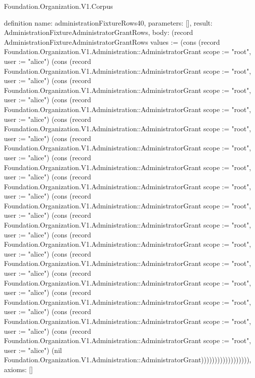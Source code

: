 \begin{lexlean}{Foundation.Organization.V1.Corpus}
\begin{semanticmodule}
definition{
  name: administrationFixtureRows40,
  parameters: [],
  result: AdministrationFixtureAdministratorGrantRows,
  body: (record AdministrationFixtureAdministratorGrantRows {values := (cons (record Foundation.Organization.V1.Administration::AdministratorGrant {scope := "root", user := "alice"}) (cons (record Foundation.Organization.V1.Administration::AdministratorGrant {scope := "root", user := "alice"}) (cons (record Foundation.Organization.V1.Administration::AdministratorGrant {scope := "root", user := "alice"}) (cons (record Foundation.Organization.V1.Administration::AdministratorGrant {scope := "root", user := "alice"}) (cons (record Foundation.Organization.V1.Administration::AdministratorGrant {scope := "root", user := "alice"}) (cons (record Foundation.Organization.V1.Administration::AdministratorGrant {scope := "root", user := "alice"}) (cons (record Foundation.Organization.V1.Administration::AdministratorGrant {scope := "root", user := "alice"}) (cons (record Foundation.Organization.V1.Administration::AdministratorGrant {scope := "root", user := "alice"}) (cons (record Foundation.Organization.V1.Administration::AdministratorGrant {scope := "root", user := "alice"}) (cons (record Foundation.Organization.V1.Administration::AdministratorGrant {scope := "root", user := "alice"}) (cons (record Foundation.Organization.V1.Administration::AdministratorGrant {scope := "root", user := "alice"}) (cons (record Foundation.Organization.V1.Administration::AdministratorGrant {scope := "root", user := "alice"}) (cons (record Foundation.Organization.V1.Administration::AdministratorGrant {scope := "root", user := "alice"}) (cons (record Foundation.Organization.V1.Administration::AdministratorGrant {scope := "root", user := "alice"}) (cons (record Foundation.Organization.V1.Administration::AdministratorGrant {scope := "root", user := "alice"}) (cons (record Foundation.Organization.V1.Administration::AdministratorGrant {scope := "root", user := "alice"}) (nil Foundation.Organization.V1.Administration::AdministratorGrant)))))))))))))))))}),
  axioms: []
}


\end{semanticmodule}
\end{lexlean}
